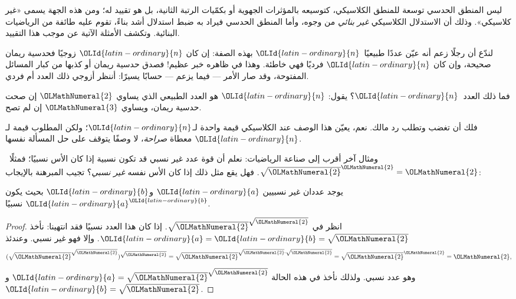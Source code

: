 \documentclass[../../../include/open-logic-section]{subfiles}
\begin{document}


ليس المنطق الحدسي توسعة للمنطق الكلاسيكي، كتوسيعه بالمؤثرات الجهوية أو
بكمّيات الرتبة الثانية، بل هو تقييد له؛ ومن هذه الجهة يسمى «غير كلاسيكي».
وذلك أن الاستدلال الكلاسيكي \emph{غير بنائي} من وجوه، وأما المنطق الحدسي
فيراد به ضبط استدلال أشد بناءً، تقوم عليه طائفة من الرياضيات البنائية.
وتكشف الأمثلة الآتية عن موجب هذا التقييد.

لندّع أن رجلًا زعم أنه عيّن عددًا طبيعيًا~${\OLId{latin-ordinary}{n}}$ بهذه الصفة: إن كان ${\OLId{latin-ordinary}{n}}$
زوجيًا فحدسية ريمان صحيحة، وإن كان ${\OLId{latin-ordinary}{n}}$ فرديًا فهي خاطئة. وهذا في ظاهره
خبر عظيم!{} فصدق حدسية ريمان أو كذبها من كبار المسائل المفتوحة، وقد صار
الأمر --- فيما يزعم --- حسابًا يسيرًا: أننظر أزوجي ذلك العدد أم فردي.

فما ذلك العدد~${\OLId{latin-ordinary}{n}}$؟ يقول: ${\OLId{latin-ordinary}{n}}$ هو العدد الطبيعي الذي يساوي ${\OLMathNumeral{2}}$ إن صحت
حدسية ريمان، ويساوي ${\OLMathNumeral{3}}$ إن لم تصح.

فلك أن تغضب وتطلب رد مالك. نعم، يعيّن هذا الوصف عند الكلاسيكي قيمة واحدة
لـ${\OLId{latin-ordinary}{n}}$؛ ولكن المطلوب قيمة لـ${\OLId{latin-ordinary}{n}}$ معطاة \emph{صراحة}، لا وصفًا يتوقف على
حل المسألة نفسها.

ومثال آخر أقرب إلى صناعة الرياضيات: نعلم أن قوة عدد غير نسبي قد تكون
نسبية إذا كان الأس نسبيًا؛ فمثلًا~$\sqrt{{\OLMathNumeral{2}}}^{\OLMathNumeral{2}} = {\OLMathNumeral{2}}$. فهل يقع مثل ذلك إذا
كان الأس نفسه \emph{غير نسبي}؟ تجيب المبرهنة بالإيجاب:

\begin{thm}
يوجد عددان غير نسبيين ${\OLId{latin-ordinary}{a}}$ و${\OLId{latin-ordinary}{b}}$ بحيث يكون ${\OLId{latin-ordinary}{a}}^{\OLId{latin-ordinary}{b}}$ نسبيًا.
\end{thm}

\begin{proof}
انظر في $\sqrt{{\OLMathNumeral{2}}}^{\sqrt{{\OLMathNumeral{2}}}}$. إذا كان هذا العدد نسبيًا فقد انتهينا:
نأخذ ${\OLId{latin-ordinary}{a}} = {\OLId{latin-ordinary}{b}} = \sqrt{{\OLMathNumeral{2}}}$. وإلا فهو غير نسبي. وعندئذ
\[
(\sqrt{{\OLMathNumeral{2}}}^{\sqrt{{\OLMathNumeral{2}}}})^{\sqrt{{\OLMathNumeral{2}}}} = \sqrt{{\OLMathNumeral{2}}}^{\sqrt{{\OLMathNumeral{2}}} \cdot
  \sqrt{{\OLMathNumeral{2}}}} = \sqrt{{\OLMathNumeral{2}}}^{\OLMathNumeral{2}} = {\OLMathNumeral{2}},
\]
وهو عدد نسبي. ولذلك نأخذ في هذه الحالة
${\OLId{latin-ordinary}{a}}=\sqrt{{\OLMathNumeral{2}}}^{\sqrt{{\OLMathNumeral{2}}}}$ و${\OLId{latin-ordinary}{b}}=\sqrt {\OLMathNumeral{2}}$.
\end{proof}
\end{document}

